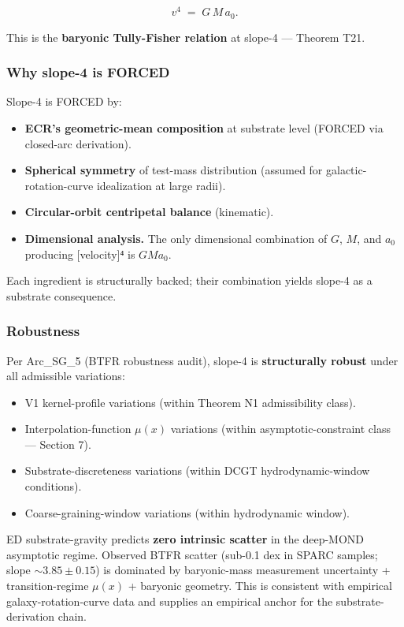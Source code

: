 \documentclass[
  11pt,a4paper]{article}
\providecommand{\tightlist}{%
  \setlength{\itemsep}{0pt}\setlength{\parskip}{0pt}}
\begin{document}
\[\boxed{\;v^4 \;=\; G\,M\,a_0.\;}\]

This is the \textbf{baryonic Tully-Fisher relation} at slope-4 ---
Theorem T21.

\subsubsection{Why slope-4 is FORCED}\label{why-slope-4-is-forced}

Slope-4 is FORCED by:

\begin{itemize}
\tightlist
\item
  \textbf{ECR's geometric-mean composition} at substrate level (FORCED
  via closed-arc derivation).
\item
  \textbf{Spherical symmetry} of test-mass distribution (assumed for
  galactic-rotation-curve idealization at large radii).
\item
  \textbf{Circular-orbit centripetal balance} (kinematic).
\item
  \textbf{Dimensional analysis.} The only dimensional combination of
  \(G\), \(M\), and \(a_0\) producing {[}velocity{]}⁴ is \(GMa_0\).
\end{itemize}

Each ingredient is structurally backed; their combination yields slope-4
as a substrate consequence.

\subsubsection{Robustness}\label{robustness}

Per Arc\_SG\_5 (BTFR robustness audit), slope-4 is \textbf{structurally
robust} under all admissible variations:

\begin{itemize}
\tightlist
\item
  V1 kernel-profile variations (within Theorem N1 admissibility class).
\item
  Interpolation-function \(\mu(x)\) variations (within
  asymptotic-constraint class --- Section 7).
\item
  Substrate-discreteness variations (within DCGT hydrodynamic-window
  conditions).
\item
  Coarse-graining-window variations (within hydrodynamic window).
\end{itemize}

ED substrate-gravity predicts \textbf{zero intrinsic scatter} in the
deep-MOND asymptotic regime. Observed BTFR scatter (sub-0.1 dex in SPARC
samples; slope \(\sim 3.85 \pm 0.15\)) is dominated by baryonic-mass
measurement uncertainty + transition-regime \(\mu(x)\) + baryonic
geometry. This is consistent with empirical galaxy-rotation-curve data
and supplies an empirical anchor for the substrate-derivation chain.
\end{document}
